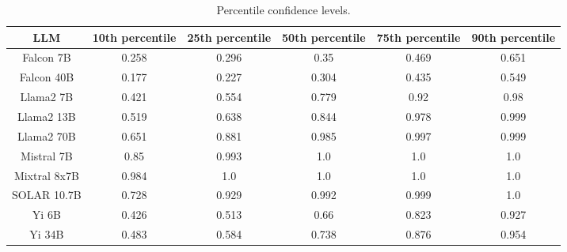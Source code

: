 \begin{table*}
\centering
\begin{tabular}{c|c|c|c|c|c}
LLM & 10th percentile & 25th percentile & 50th percentile & 75th percentile & 90th percentile\\ \hline
Falcon 7B & 0.258 & 0.296 & 0.35 & 0.469 & 0.651\\
Falcon 40B & 0.177 & 0.227 & 0.304 & 0.435 & 0.549\\
Llama2 7B & 0.421 & 0.554 & 0.779 & 0.92 & 0.98\\
Llama2 13B & 0.519 & 0.638 & 0.844 & 0.978 & 0.999\\
Llama2 70B & 0.651 & 0.881 & 0.985 & 0.997 & 0.999\\
Mistral 7B & 0.85 & 0.993 & 1.0 & 1.0 & 1.0\\
Mixtral 8x7B & 0.984 & 1.0 & 1.0 & 1.0 & 1.0\\
SOLAR 10.7B & 0.728 & 0.929 & 0.992 & 0.999 & 1.0\\
Yi 6B & 0.426 & 0.513 & 0.66 & 0.823 & 0.927\\
Yi 34B & 0.483 & 0.584 & 0.738 & 0.876 & 0.954\\
\hline
\end{tabular}
\caption{Percentile confidence levels.}
\label{tab:percentile_conf}
\end{table*}
